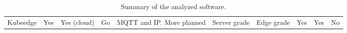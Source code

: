 \begin{table}[h!]
\begin{center}
{{\begin{tabular}{l|lll p{2.5cm} lllll}
Kubeedge          & Yes                                                                                                                            & Yes (cloud)                                                                                                                                  & Go   & MQTT and IP. More planned & Server grade                                                                                                                               & Edge grade                                                                                                                               & Yes                                                                                                                               & Yes                                                                                                                                   & No                                                                                                                         
\end{tabular}}}
    \caption{Summary of the analyzed software.}
    \label{tab:shortSotaSoftware}
    \end{center}
\end{table}